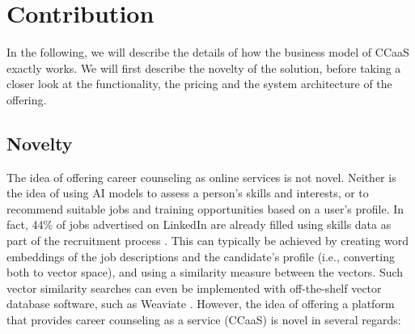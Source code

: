 \section{Contribution}
\label{sec:contribution}

In the following, we will describe the details of how the business model of CCaaS exactly works.
We will first describe the novelty of the solution, before taking a closer look at the functionality,
the pricing and the system architecture of the offering.

\subsection{Novelty}

The idea of offering career counseling as online services is not novel. Neither is the idea of
using AI models to assess a person's skills and interests, or to recommend suitable jobs and training
opportunities based on a user's profile. In fact, 44\% of jobs advertised on LinkedIn are already
filled using skills data as part of the recruitment process \citep{kaserAIpoweredCareerCounseling2023}.
This can typically be achieved by creating word embeddings of the job descriptions and the candidate's
profile (i.e., converting both to vector space), and using a similarity measure between the
vectors. Such vector similarity searches can even be implemented with off-the-shelf vector database
software, such as Weaviate \citep{dilockerWeaviate2023}. However, the idea of offering a platform that
provides career counseling as a service (CCaaS) is novel in several regards:

